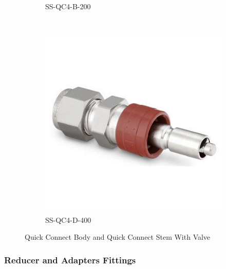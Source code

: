 \begin{figure}[H]
\begin{subfigure}[b]{0.21\textwidth}
    \caption{SS-QC4-B-200}
    \end{subfigure}
    ~
    \begin{subfigure}[b]{0.21\textwidth}
    \centering
    \includegraphics[width=\textwidth]{appendix/img/interfaces/SS-QC4-B-400.jpg}
    \caption{SS-QC4-D-400}
    \end{subfigure}
    \caption{Quick Connect Body and Quick Connect Stem With Valve}
    \label{Appx:QC_fittings}
\end{figure}

\subsubsection{Reducer and Adapters Fittings}

